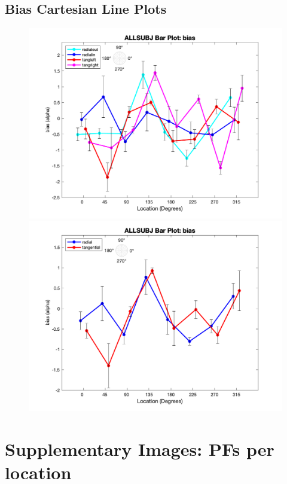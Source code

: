 \documentclass[11pt]{article} %
\begin{document}
\subsection{Bias Cartesian Line Plots}
\begin{figure}[H]
\centering %
\includegraphics[scale=.35]{Images/ALLSUBJ_LP_bias_Alldata_4conds.png}
\includegraphics[scale=.35]{Images/ALLSUBJ_LP_bias_Alldata_2conds.png}
\end{figure}

\newpage
\section{Supplementary Images: PFs per location}
\end{document}
